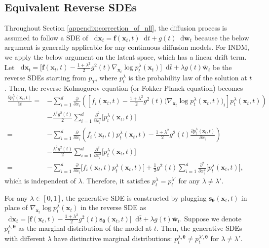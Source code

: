 \documentclass{article}
\theoremstyle{definition}
\theoremstyle{remark}
\newcommand*\diff{\mathop{}\!\mathrm{d}}
\begin{document}
	\subsection{Equivalent Reverse SDEs}\label{appendix:equivalent_reverse_sdes}
	
	Throughout Section \ref{appendix:correction_of_nll}, the diffusion process is assumed to follow a SDE of $\diff\mathbf{x}_{t}=\mathbf{f}(\mathbf{x}_{t},t)\diff t+g(t)\diff\mathbf{w}_{t}$ because the below argument is generally applicable for any continuous diffusion models. For INDM, we apply the below argument on the latent space, which has a linear drift term. Let $\diff\mathbf{x}_{t}=\big[\mathbf{f}(\mathbf{x}_{t},t)-\frac{1+\lambda^{2}}{2}g^{2}(t)\nabla_{\mathbf{x}_{t}}\log{p_{t}^{\lambda}(\mathbf{x}_{t})}\big]\diff \bar{t}+\lambda g(t)\bar{\mathbf{w}}_{t}$ be the reverse SDEs starting from $p_{T}$, where $p_{t}^{\lambda}$ is the probability law of the solution at $t$. Then, the reverse Kolmogorov equation (or Fokker-Planck equation) becomes
	\begin{align*}
	\frac{\partial p_{t}^{\lambda}(\mathbf{x}_{t},t)}{\partial t}=&-\sum_{i=1}^{d}\frac{\partial}{\partial x_{i}}\left(\left[ f_{i}(\mathbf{x}_{t},t)-\frac{1+\lambda^{2}}{2}g^{2}(t)\big(\nabla_{\mathbf{x}_{t}}\log{p_{t}^{\lambda}(\mathbf{x}_{t},t)}\big)_{i} \right]p_{t}^{\lambda}(\mathbf{x}_{t},t)\right)\\
	&-\frac{\lambda^{2}g^{2}(t)}{2}\sum_{i=1}^{d}\frac{\partial^{2}}{\partial x_{i}^{2}}\big[p_{t}^{\lambda}(\mathbf{x}_{t},t)\big]\\
	=&-\sum_{i=1}^{d}\frac{\partial}{\partial x_{i}}\left( f_{i}(\mathbf{x}_{t},t)p_{t}^{\lambda}(\mathbf{x}_{t},t)-\frac{1+\lambda^{2}}{2}g^{2}(t)\frac{\partial p_{t}^{\lambda}(\mathbf{x}_{t},t)}{\partial x_{i}} \right)\\
	&-\frac{\lambda^{2}g^{2}(t)}{2}\sum_{i=1}^{d}\frac{\partial^{2}}{\partial x_{i}^{2}}\big[p_{t}^{\lambda}(\mathbf{x}_{t},t)\big]\\
	=&-\sum_{i=1}^{d}\frac{\partial}{\partial x_{i}}\big[f_{i}(\mathbf{x}_{t},t)p_{t}^{\lambda}(\mathbf{x}_{t},t)\big]+\frac{1}{2}g^{2}(t)\sum_{i=1}^{d}\frac{\partial^{2}}{\partial x_{i}^{2}}\big[p_{t}^{\lambda}(\mathbf{x}_{t},t)\big],
	\end{align*}
	which is independent of $\lambda$. Therefore, it satisfies $p_{t}^{\lambda}=p_{t}^{\lambda'}$ for any $\lambda\neq\lambda'$. 
	
	For any $\lambda\in[0,1]$, the generative SDE is constructed by plugging $\mathbf{s}_{\bm{\theta}}(\mathbf{x}_{t},t)$ in place of $\nabla_{\mathbf{x}_{t}}\log{p_{t}^{\lambda}(\mathbf{x}_{t})}$ in the reverse SDE as $\diff\mathbf{x}_{t}=\big[\mathbf{f}(\mathbf{x}_{t},t)-\frac{1+\lambda^{2}}{2}g^{2}(t)\mathbf{s}_{\bm{\theta}}(\mathbf{x}_{t},t)\big]\diff \bar{t}+\lambda g(t)\bar{\mathbf{w}}_{t}$. Suppose we denote $p_{t}^{\lambda,\bm{\theta}}$ as the marginal distribution of the model at $t$. Then, the generative SDEs with different $\lambda$ have distinctive marginal distributions: $p_{t}^{\lambda,\bm{\theta}}\neq p_{t}^{\lambda',\bm{\theta}}$ for $\lambda\neq\lambda'$.
	
\end{document}
